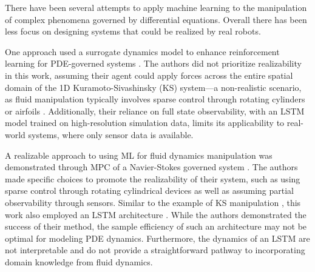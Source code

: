There have been several attempts to apply machine learning to the manipulation of complex phenomena governed by differential equations. Overall there has been less focus on designing systems that could be realized by real robots. 


One approach used a surrogate dynamics model to enhance reinforcement learning for PDE-governed systems \cite{werner_2023_learning}. The authors did not prioritize realizability in this work, assuming their agent could apply forces across the entire spatial domain of the 1D Kuramoto-Sivashinsky (KS) system—a non-realistic scenario, as fluid manipulation typically involves sparse control through rotating cylinders \cite{bieker_2020_deep} or airfoils \cite{CHEN_XU_LU_2010}. Additionally, their reliance on full state observability, with an LSTM model trained on high-resolution simulation data, limits its applicability to real-world systems, where only sensor data is available.

A realizable approach to using ML for fluid dynamics manipulation was demonstrated through MPC of a Navier-Stokes governed system \cite{bieker_2020_deep}. The authors made specific choices to promote the realizability of their system, such as  using sparse control through rotating cylindrical devices as well as assuming partial observability through sensors. Similar to the example of KS manipulation \cite{werner_2023_learning}, this work also employed an LSTM architecture \cite{bieker_2020_deep}. While the authors demonstrated the success of their method, the sample efficiency of such an architecture may not be optimal for modeling PDE dynamics. Furthermore, the dynamics of an LSTM are not interpretable and do not provide a straightforward pathway to incorporating domain knowledge from fluid dynamics.

